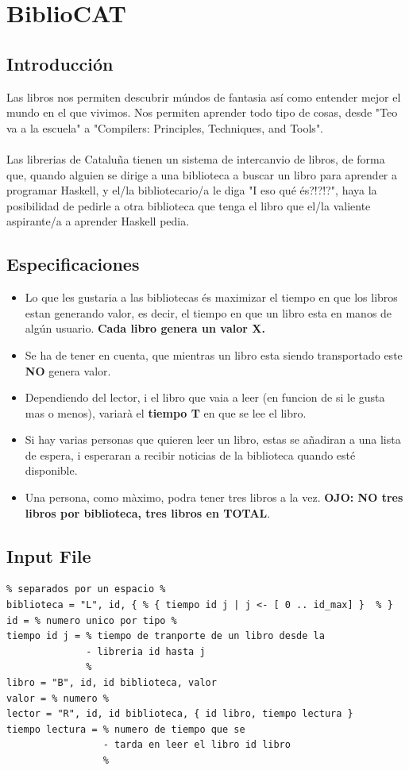 \documentclass{article}
\begin{document}
\section{BiblioCAT}
\subsection{Introducción}
Las libros nos permiten descubrir múndos de fantasia así como entender mejor el mundo en el que vivimos. Nos permiten aprender todo tipo de cosas, desde "Teo va a la escuela" a "Compilers: Principles, Techniques, and Tools".\\\\
%
Las librerias de Cataluña tienen un sistema de intercanvio de libros, de forma que, quando alguien se dirige a una biblioteca a buscar un libro para aprender a programar Haskell, y el/la bibliotecario/a le diga "I eso qué és?!?!?", haya la posibilidad de pedirle a otra biblioteca que tenga el libro que el/la valiente aspirante/a a aprender Haskell pedia.
%
\subsection{Especificaciones}
\begin{itemize}
\item Lo que les gustaria a las bibliotecas és maximizar el tiempo en que los libros estan generando valor, es decir, el tiempo en que un libro esta en manos de algún usuario. \textbf{Cada libro genera un valor X.} 

\item Se ha de tener en cuenta, que mientras un libro esta siendo transportado este \textbf{NO} genera valor. 

\item Dependiendo del lector, i el libro que vaia a leer (en funcion de si le gusta mas o menos), variarà el \textbf{tiempo T} en que se lee el libro.

\item Si hay varias personas que quieren leer un libro, estas se añadiran a una lista de espera, i esperaran a recibir noticias de la biblioteca quando esté disponible.

\item Una persona, como màximo, podra tener tres libros a la vez. \textbf{OJO: NO tres libros por biblioteca, tres libros en TOTAL}. 
\end{itemize}
\subsection{Input File}
\begin{verbatim}
% separados por un espacio %
biblioteca = "L", id, { % { tiempo id j | j <- [ 0 .. id_max] }  % }
id = % numero unico por tipo %
tiempo id j = % tiempo de tranporte de un libro desde la
              - libreria id hasta j
              %
libro = "B", id, id biblioteca, valor
valor = % numero %
lector = "R", id, id biblioteca, { id libro, tiempo lectura }
tiempo lectura = % numero de tiempo que se
                 - tarda en leer el libro id libro
                 %
\end{verbatim}
\end{document}
